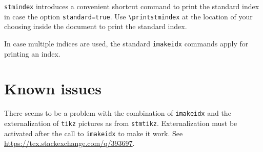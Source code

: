 \documentclass{scrartcl}
\begin{document}
\texttt{stmindex} introduces a convenient shortcut command to print the standard index in case the option \texttt{standard=true}. Use \verb+\printstmindex+ at the location of your choosing inside the document to print the standard index.

In case multiple indices are used, the standard \texttt{imakeidx} commands apply for printing an index.

\section{Known issues}

There seems to be a problem with the combination of \texttt{imakeidx} and the externalization of \texttt{tikz} pictures as from \texttt{stmtikz}. Externalization must be activated after the call to \texttt{imakeidx} to make it work. See \url{https://tex.stackexchange.com/q/393697}.








\end{document}
